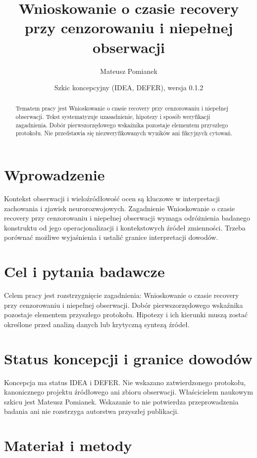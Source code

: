 \documentclass[11pt,a4paper]{article}
\title{Wnioskowanie o czasie recovery przy cenzorowaniu i niepełnej obserwacji}
\author{Mateusz Pomianek}
\date{Szkic koncepcyjny (IDEA, DEFER), wersja 0.1.2}
\begin{document}
\maketitle

\begin{abstract}

Tematem pracy jest Wnioskowanie o czasie recovery przy cenzorowaniu i niepełnej obserwacji. Tekst systematyzuje uzasadnienie, hipotezy i sposób weryfikacji zagadnienia. Dobór pierwszorzędowego wskaźnika pozostaje elementem przyszłego protokołu. Nie przedstawia się niezweryfikowanych wyników ani fikcyjnych cytowań.

\end{abstract}

\section{Wprowadzenie}

Kontekst obserwacji i wieloźródłowość ocen są kluczowe w interpretacji zachowania i zjawisk neurorozwojowych. Zagadnienie Wnioskowanie o czasie recovery przy cenzorowaniu i niepełnej obserwacji wymaga odróżnienia badanego konstruktu od jego operacjonalizacji i kontekstowych źródeł zmienności. Trzeba porównać możliwe wyjaśnienia i ustalić granice interpretacji dowodów.

\section{Cel i pytania badawcze}

Celem pracy jest rozstrzygnięcie zagadnienia: Wnioskowanie o czasie recovery przy cenzorowaniu i niepełnej obserwacji. Dobór pierwszorzędowego wskaźnika pozostaje elementem przyszłego protokołu. Hipotezy i ich kierunki muszą zostać określone przed analizą danych lub krytyczną syntezą źródeł.

\section{Status koncepcji i granice dowodów}

Koncepcja ma status IDEA i DEFER. Nie wskazano zatwierdzonego protokołu, kanonicznego projektu źródłowego ani zbioru obserwacji. Właścicielem naukowym szkicu jest Mateusz Pomianek. Wskazanie to nie potwierdza przeprowadzenia badania ani nie rozstrzyga autorstwa przyszłej publikacji.

\section{Materiał i metody}
\end{document}
